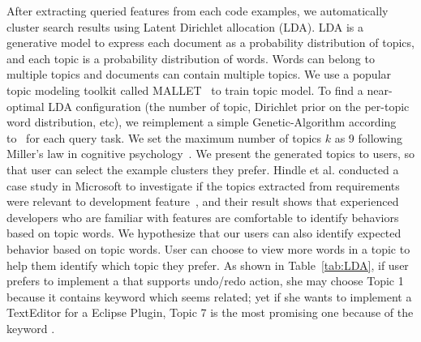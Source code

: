   After extracting queried features from each code examples, we automatically cluster search results using Latent Dirichlet allocation (LDA). LDA is a generative  model to express each document as a probability distribution of topics, and each topic is a probability distribution of words. Words can belong to multiple topics and documents can contain multiple topics.  We use a popular topic modeling toolkit called MALLET~\cite{McCallumMALLET} to train topic model. 
To find a near-optimal LDA configuration (the number of topic, Dirichlet prior on the per-topic word distribution, etc), we reimplement a simple Genetic-Algorithm according to~\cite{Denys:LDAGA13} for each query task. We set the maximum number of topics $k$ as 9 following Miller's law in cognitive psychology~\cite{Miller:72}. We present the generated topics to users, so that user can select the example clusters they prefer. Hindle et al. \/conducted a case study in Microsoft to investigate if the topics extracted from requirements were relevant to development feature~\cite{Hindle:topicModel12}, and their result shows that experienced developers who are familiar with features are comfortable to identify behaviors based on topic words. We hypothesize that our users can also identify expected behavior based on topic words. User can choose to view more words in a topic to help them identify which topic they prefer. As shown in Table~\ref{tab:LDA}, if user prefers to implement a   that supports undo/redo action, she may choose Topic 1 because it contains keyword  which seems related; yet if she wants to implement a TextEditor for a Eclipse Plugin, Topic 7 is the most promising one because of the keyword .

